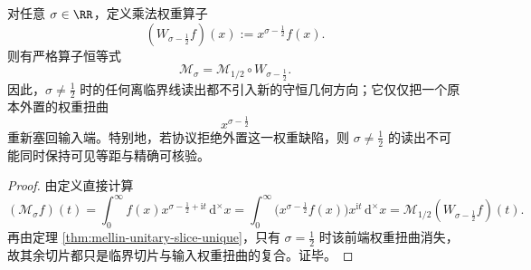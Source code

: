 \begin{corollary}[离临界线位移不产生新的守恒几何]\label{cor:conclusion-offcritical-shift-carries-no-new-geometry}
对任意 \(\sigma\in\RR\)，定义乘法权重算子
\[
(W_{\sigma-\frac12}f)(x):=x^{\sigma-\frac12}f(x).
\]
则有严格算子恒等式
\[
\mathcal M_\sigma=\mathcal M_{1/2}\circ W_{\sigma-\frac12}.
\]
因此，\(\sigma\neq \frac12\) 时的任何离临界线读出都不引入新的守恒几何方向；它仅仅把一个原本外置的权重扭曲
\[
x^{\sigma-\frac12}
\]
重新塞回输入端。特别地，若协议拒绝外置这一权重缺陷，则 \(\sigma\neq \frac12\) 的读出不可能同时保持可见等距与精确可核验。
\end{corollary}
\begin{proof}
由定义直接计算
\[
(\mathcal M_\sigma f)(t)
=
\int_0^\infty f(x)x^{\sigma-\frac12+\mathrm{i}t}\,\mathrm d^\times x
=
\int_0^\infty \bigl(x^{\sigma-\frac12}f(x)\bigr)x^{\mathrm{i}t}\,\mathrm d^\times x
=
\mathcal M_{1/2}(W_{\sigma-\frac12}f)(t).
\]
再由定理 \ref{thm:mellin-unitary-slice-unique}，只有 \(\sigma=\frac12\) 时该前端权重扭曲消失，故其余切片都只是临界切片与输入权重扭曲的复合。证毕。
\end{proof}

